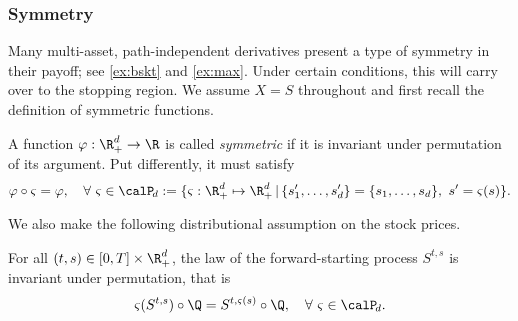 \subsubsection{Symmetry}\label{sec:symmetry}

Many multi-asset, path-independent derivatives  present a type of symmetry in their payoff; see  \cref{ex:bskt} and \ref{ex:max}. Under certain conditions, this will carry over to the  stopping region. 
We assume $X=S$ throughout and  first recall the definition of symmetric functions. 

\begin{definition}
  A  function $\varphi: \R_+^d \to \R$ is called  \textit{symmetric} if it is invariant under permutation of its argument. Put differently, it must satisfy
    $$\varphi \circ \varsigma = \varphi, \quad \forall \ \varsigma \in \calP_{\! d} :=  \{\varsigma: \R^d_+ \mapsto \R^d_+ \, |\, \{s'_1,\ldots,s'_d\}=\{s_1,\ldots,s_d\}, \ s' = \varsigma(s) \}.$$%
\end{definition}

We also make the following distributional assumption on the stock prices.

\begin{asm}\label{asm: id} For all $(t,s)\in [0,T]\times \R_+^d$, the law of the forward-starting process $S^{t,s}$  is invariant under permutation, that is
    \begin{equation}\label{eq:id}
        \varsigma(S^{t,s}) \circ \Q = S^{t,\varsigma(s)} \circ  \Q, \quad \forall \ \varsigma \in \calP_{\!d}.
    \end{equation}

\end{asm}

